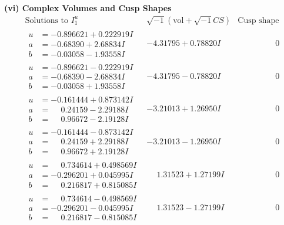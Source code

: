 \documentclass[1p]{elsarticle_modified}
\theoremstyle{definition}
\newcommand{\I}{\sqrt{-1}}
\begin{document}
\newpage\flushleft \textbf{(vi) Complex Volumes and Cusp Shapes}
$$\begin{array}{c|c|c}  
\text{Solutions to }I^u_{1}& \I (\text{vol} + \sqrt{-1}CS) & \text{Cusp shape}\\
 \hline 
\begin{aligned}
u &= -0.896621 + 0.222919 I \\
a &= -0.68390 + 2.68834 I \\
b &= -0.03058 - 1.93558 I\end{aligned}
 & -4.31795 + 0.78820 I & \phantom{-0.000000 } 0 \\ \hline\begin{aligned}
u &= -0.896621 - 0.222919 I \\
a &= -0.68390 - 2.68834 I \\
b &= -0.03058 + 1.93558 I\end{aligned}
 & -4.31795 - 0.78820 I & \phantom{-0.000000 } 0 \\ \hline\begin{aligned}
u &= -0.161444 + 0.873142 I \\
a &= \phantom{-}0.24159 - 2.29188 I \\
b &= \phantom{-}0.96672 - 2.19128 I\end{aligned}
 & -3.21013 + 1.26950 I & \phantom{-0.000000 } 0 \\ \hline\begin{aligned}
u &= -0.161444 - 0.873142 I \\
a &= \phantom{-}0.24159 + 2.29188 I \\
b &= \phantom{-}0.96672 + 2.19128 I\end{aligned}
 & -3.21013 - 1.26950 I & \phantom{-0.000000 } 0 \\ \hline\begin{aligned}
u &= \phantom{-}0.734614 + 0.498569 I \\
a &= -0.296201 + 0.045995 I \\
b &= \phantom{-}0.216817 + 0.815085 I\end{aligned}
 & \phantom{-}1.31523 + 1.27199 I & \phantom{-0.000000 } 0 \\ \hline\begin{aligned}
u &= \phantom{-}0.734614 - 0.498569 I \\
a &= -0.296201 - 0.045995 I \\
b &= \phantom{-}0.216817 - 0.815085 I\end{aligned}
 & \phantom{-}1.31523 - 1.27199 I & \phantom{-0.000000 } 0 \\ \hline\begin{aligned}

\end{aligned}
\end{array}$$
\end{document}
